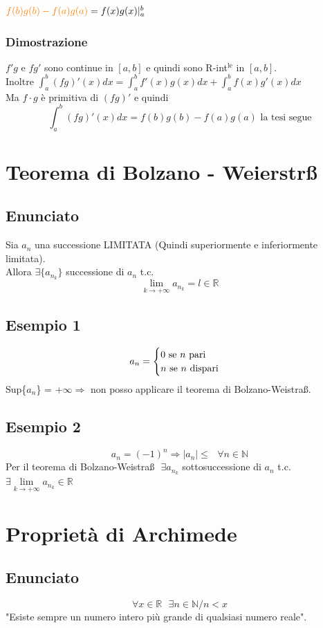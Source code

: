 \documentclass{article}
\newcommand{\R}{\mathbb{R}}
\newcommand{\N}{\mathbb{N}}
\begin{document}
\begin{flushleft}
$\textcolor{orange}{ f(b)g(b) - f(a)g(a)} = f(x)g(x)|_{a}^{b}$

\subsubsection{Dimostrazione}
$f'g$ e $fg'$ sono continue in $[a,b]$ e quindi sono R-int$^\text{le}$ in $[a,b]$.\\
Inoltre $\int_{a}^{b}(fg)'(x)dx = \int_{a}^{b}f'(x)g(x)dx + \int_{a}^{b}f(x)g'(x)dx$\\
Ma  $f \cdot g$ è primitiva di  $(fg)'$ e quindi
\[
    \int_{a}^{b}(fg)'(x)dx = f(b)g(b) - f(a)g(a) \text{ la tesi segue}
\]


\section{Teorema di Bolzano - Weierstr\ss}
\subsection{Enunciato}
Sia ${a_n}$ una successione LIMITATA (Quindi superiormente e inferiormente limitata).\\
Allora $\exists \{ a_{n_k} \}$ successione di $a_n$ t.c. 
\[\lim\limits_{k \to + \infty } a_{n_k} = l \in \R\]

\subsection{Esempio 1}
\[
    a_n  =
    \begin{cases}
        0 $ se $ n $ pari$\\
        n $ se $ n $ dispari$
    \end{cases}
\]
Sup\{$a_n$\} = $+ \infty \Rightarrow$ non posso applicare il teorema di Bolzano-Weistra\ss.

\subsection{Esempio 2}
\[
    a_n = (-1)^n \Rightarrow \left|a_n\right| \leq \text{ } \forall n \in \N
\]
Per il teorema di Bolzano-Weistra\ss $ \text{ } \exists a_{n_k}$ sottosuccessione di $a_n$ t.c. $\exists \lim\limits_{k \to + \infty} a_{n_k} \in \R$

\section{Proprietà di Archimede} \label{Archimede}
\subsection{Enunciato}
\[ \forall x \in \R \text{ } \exists n \in \N / n < x \]
"Esiste sempre un numero intero più grande di qualsiasi numero reale".

\end{flushleft}
\end{document}
